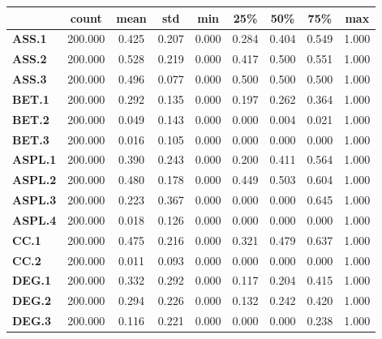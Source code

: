 \documentclass[
	article,			%
	11pt,				%
	oneside,			%
	a4paper,			%
	english,			%
	brazil,				%
	sumario=tradicional
	]{abntex2}
\begin{document}
\newpage
\begin{table}[H]
\centering
\begin{tabular}{l|c|c|c|c|c|c|c|c|}
\cline{2-9}
                                      & count   & mean  & std   & min   & 25\%  & 50\%  & 75\%  & max   \\ \hline
\multicolumn{1}{|l|}{\textbf{ASS.1}}  & 200.000 & 0.425 & 0.207 & 0.000 & 0.284 & 0.404 & 0.549 & 1.000 \\ \hline
\multicolumn{1}{|l|}{\textbf{ASS.2}}  & 200.000 & 0.528 & 0.219 & 0.000 & 0.417 & 0.500 & 0.551 & 1.000 \\ \hline
\multicolumn{1}{|l|}{\textbf{ASS.3}}  & 200.000 & 0.496 & 0.077 & 0.000 & 0.500 & 0.500 & 0.500 & 1.000 \\ \hline
\multicolumn{1}{|l|}{\textbf{BET.1}}  & 200.000 & 0.292 & 0.135 & 0.000 & 0.197 & 0.262 & 0.364 & 1.000 \\ \hline
\multicolumn{1}{|l|}{\textbf{BET.2}}  & 200.000 & 0.049 & 0.143 & 0.000 & 0.000 & 0.004 & 0.021 & 1.000 \\ \hline
\multicolumn{1}{|l|}{\textbf{BET.3}}  & 200.000 & 0.016 & 0.105 & 0.000 & 0.000 & 0.000 & 0.000 & 1.000 \\ \hline
\multicolumn{1}{|l|}{\textbf{ASPL.1}} & 200.000 & 0.390 & 0.243 & 0.000 & 0.200 & 0.411 & 0.564 & 1.000 \\ \hline
\multicolumn{1}{|l|}{\textbf{ASPL.2}} & 200.000 & 0.480 & 0.178 & 0.000 & 0.449 & 0.503 & 0.604 & 1.000 \\ \hline
\multicolumn{1}{|l|}{\textbf{ASPL.3}} & 200.000 & 0.223 & 0.367 & 0.000 & 0.000 & 0.000 & 0.645 & 1.000 \\ \hline
\multicolumn{1}{|l|}{\textbf{ASPL.4}} & 200.000 & 0.018 & 0.126 & 0.000 & 0.000 & 0.000 & 0.000 & 1.000 \\ \hline
\multicolumn{1}{|l|}{\textbf{CC.1}}   & 200.000 & 0.475 & 0.216 & 0.000 & 0.321 & 0.479 & 0.637 & 1.000 \\ \hline
\multicolumn{1}{|l|}{\textbf{CC.2}}   & 200.000 & 0.011 & 0.093 & 0.000 & 0.000 & 0.000 & 0.000 & 1.000 \\ \hline
\multicolumn{1}{|l|}{\textbf{DEG.1}}  & 200.000 & 0.332 & 0.292 & 0.000 & 0.117 & 0.204 & 0.415 & 1.000 \\ \hline
\multicolumn{1}{|l|}{\textbf{DEG.2}}  & 200.000 & 0.294 & 0.226 & 0.000 & 0.132 & 0.242 & 0.420 & 1.000 \\ \hline
\multicolumn{1}{|l|}{\textbf{DEG.3}}  & 200.000 & 0.116 & 0.221 & 0.000 & 0.000 & 0.000 & 0.238 & 1.000 \\ \hline

\end{tabular}
\end{table}
\end{document}
